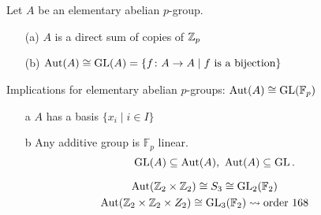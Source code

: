 \documentclass[11pt,leqno,oneside]{amsart}
\newcommand{\Fp}{{\mathbb{F}_p}} %
\newcommand{\isom}{\mathrel{\cong}}
\newcommand{\Aut}{\text{Aut}}  %
\begin{document}
\begin{cor}[1.2.14]
  Let \(A\) be an elementary abelian
  \(p\)-group.
  \begin{enumerate}
  \item[(a)] \(A\) is a direct sum of
    copies of \({\mathbb Z}_p\)
  \item[(b)]
    \(\Aut(A) \isom \GL(A)=\{f \colon A
    \to A \mid f \text{ is a
      bijection}\}\)
  \end{enumerate}
\end{cor}

Implications for elementary abelian
\(p\)-groups: \(\Aut(A) \isom \GL(\Fp)\)
\begin{enumerate}
\item[a] \(A\) has a basis
  \(\{x_i \mid i \in I\}\)
\item[b] Any additive group is \(\Fp\)
  linear.
  \[\GL(A) \subseteq \Aut(A),\ \Aut(A)
    \subseteq \GL.\]
\end{enumerate}

\begin{example*}
  \begin{gather*}
    \Aut(\Z_2 \times \Z_2) \isom S_3 \isom \GL_2(\mathbb{F}_2)\\
    \Aut(\Z_2 \times \Z_2 \times Z_2)
    \isom \GL_3(\mathbb{F}_2)
    \rightsquigarrow \text{order 168}
  \end{gather*}
\end{example*}
\end{document}
